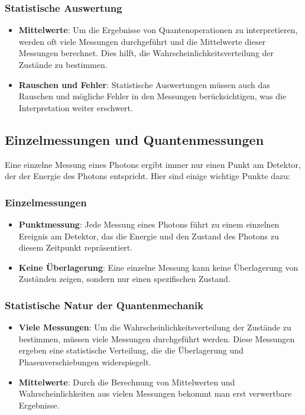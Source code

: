 \documentclass[12pt,a4paper]{article}
\begin{document}
	\subsubsection{Statistische Auswertung}
	\begin{itemize}
		\item \textbf{Mittelwerte}: Um die Ergebnisse von Quantenoperationen zu interpretieren, werden oft viele Messungen durchgeführt und die Mittelwerte dieser Messungen berechnet. Dies hilft, die Wahrscheinlichkeitsverteilung der Zustände zu bestimmen.
		\item \textbf{Rauschen und Fehler}: Statistische Auswertungen müssen auch das Rauschen und mögliche Fehler in den Messungen berücksichtigen, was die Interpretation weiter erschwert.
	\end{itemize}
	
	
	
	\subsection{Einzelmessungen und Quantenmessungen}
	
	Eine einzelne Messung eines Photons ergibt immer nur einen Punkt am Detektor, der der Energie des Photons entspricht. Hier sind einige wichtige Punkte dazu:
	
	\subsubsection{Einzelmessungen}
	\begin{itemize}
		\item \textbf{Punktmessung}: Jede Messung eines Photons führt zu einem einzelnen Ereignis am Detektor, das die Energie und den Zustand des Photons zu diesem Zeitpunkt repräsentiert.
		\item \textbf{Keine Überlagerung}: Eine einzelne Messung kann keine Überlagerung von Zuständen zeigen, sondern nur einen spezifischen Zustand.
	\end{itemize}
	
	\subsubsection{Statistische Natur der Quantenmechanik}
	\begin{itemize}
		\item \textbf{Viele Messungen}: Um die Wahrscheinlichkeitsverteilung der Zustände zu bestimmen, müssen viele Messungen durchgeführt werden. Diese Messungen ergeben eine statistische Verteilung, die die Überlagerung und Phasenverschiebungen widerspiegelt.
		\item \textbf{Mittelwerte}: Durch die Berechnung von Mittelwerten und Wahrscheinlichkeiten aus vielen Messungen bekommt man erst verwertbare Ergebnisse.
	\end{itemize}
	
\end{document}
